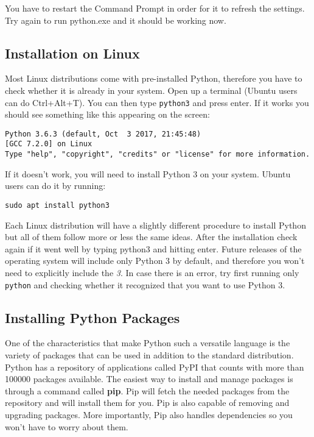 You have to restart the Command Prompt in order for it to refresh the settings. Try again to run python.exe and it should be working now.

\subsection{Installation on Linux}
Most Linux distributions come with pre-installed Python, therefore you have to check whether it is already in your system. Open up a terminal (Ubuntu users can do Ctrl+Alt+T). You can then type \texttt{python3} and press enter. If it works you should see something like this appearing on the screen:

\begin{verbatim}
Python 3.6.3 (default, Oct  3 2017, 21:45:48)
[GCC 7.2.0] on Linux
Type "help", "copyright", "credits" or "license" for more information.
\end{verbatim}

If it doesn't work, you will need to install Python 3 on your system. Ubuntu users can do it by running:
\begin{verbatim}
sudo apt install python3
\end{verbatim}

Each Linux distribution will have a slightly different procedure to install Python but all of them follow more or less the same ideas. After the installation check again if it went well by typing python3 and hitting enter. Future releases of the operating system will include only Python 3 by default, and therefore you won't need to explicitly include the \emph{3}. In case there is an error, try first running only \texttt{python} and checking whether it recognized that you want to use Python 3.

\subsection{Installing Python Packages}
One of the characteristics that make Python such a versatile language is the variety of packages that can be used in addition to the standard distribution. Python has a repository of applications called PyPI that counts with more than 100000 packages available. The easiest way to install and manage packages is through a command called \textbf{pip}. Pip will fetch the needed packages from the repository and will install them for you. Pip is also capable of removing and upgrading packages. More importantly, Pip also handles dependencies so you won’t have to worry about them.


